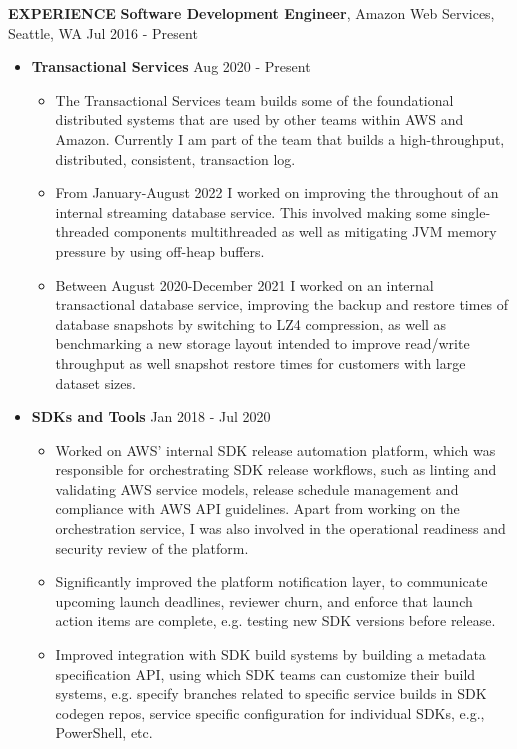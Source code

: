 \documentclass[10pt, a4paper]{article}
\begin{document}
\textbf{EXPERIENCE}
\smallskip
\newline
\textbf{Software Development Engineer}, Amazon Web Services, Seattle, WA \hfill Jul 2016 - Present
\begin{itemize}
\item \textbf{Transactional Services} \hfill Aug 2020 - Present
  \begin{itemize}[label=$\bullet$]
  \item The Transactional Services team builds some of the foundational distributed systems that are used by other teams within AWS and Amazon. Currently I am part of the team that builds a high-throughput, distributed, consistent, transaction log.
  \item From January-August 2022 I worked on improving the throughout of an internal streaming database service. This involved making some single-threaded components multithreaded as well as mitigating JVM memory pressure by using off-heap buffers.
  \item Between August 2020-December 2021 I worked on an internal transactional database service, improving the backup and restore times of database snapshots by switching to LZ4 compression, as well as benchmarking a new storage layout intended to improve read/write throughput as well snapshot restore times for customers with large dataset sizes.
  \end{itemize}
\item \textbf{SDKs and Tools} \hfill Jan 2018 - Jul 2020
  \begin{itemize}[label=$\bullet$]
  \item Worked on AWS' internal SDK release automation platform, which was responsible for orchestrating SDK release workflows, such as linting and validating AWS service models, release schedule management and compliance with AWS API guidelines. Apart from working on the orchestration service, I was also involved in the operational readiness and security review of the platform.
  \item Significantly improved the platform notification layer, to communicate upcoming launch deadlines, reviewer churn, and enforce that launch action items are complete, e.g. testing new SDK versions before release.
  \item Improved integration with SDK build systems by building a metadata specification API, using which SDK teams can customize their build systems, e.g. specify branches related to specific service builds in SDK codegen repos, service specific configuration for individual SDKs, e.g., PowerShell, etc.

\end{itemize}
\end{itemize}
\end{document}

